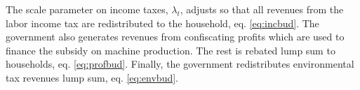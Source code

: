 The scale parameter on income taxes, $\lambda_t$, adjusts so that all revenues from the labor income tax are redistributed to the household, eq. \eqref{eq:incbud}.
The government also generates revenues from confiscating profits which are used to finance the subsidy on machine production. The rest is rebated lump sum to households, eq. \eqref{eq:profbud}. 
Finally, the government redistributes environmental tax revenues lump sum, eq. \eqref{eq:envbud}.

